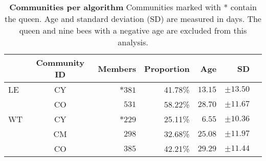 \begin{table}[htb]
\small
\centering
\caption[Communities per algorithm]{\textbf{Communities per algorithm} Communities marked with * contain the queen. Age and standard deviation (SD) are measured in days. The queen and nine bees with a negative age are excluded from this analysis.}
\label{tab:n3-communities}
\vspace*{5mm}
\begin{tabular}{lcrrrrr}
	\toprule
	{}  & Community ID & Members & Proportion & Age & SD\\
	\midrule  
	\quad LE  & CY & $*381$  & 41.78\% & $13.15$ & $\pm13.50$ \\
	          & CO & $531$   & 58.22\% & $28.70$ & $\pm11.67$ \\
    \midrule 
	\quad WT & CY & $*229$  & 25.11\% & $6.55$  & $\pm10.36$\\
			 & CM & $298$  & 32.68\% & $25.08$ & $\pm11.97$\\
			 & CO & $385$  & 42.21\% & $29.29$ & $\pm11.44$\\
	\bottomrule
\end{tabular}
\end{table}